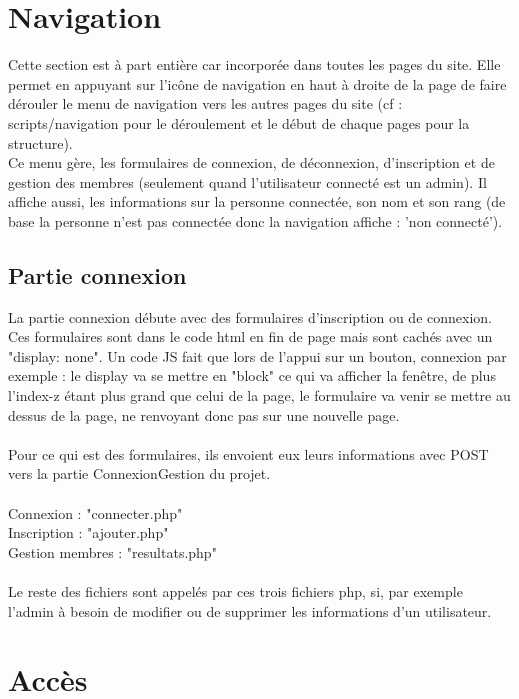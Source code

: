 \documentclass{article}
\begin{document}
\section{Navigation}

Cette section est à part entière car incorporée dans toutes les pages du site. Elle permet en appuyant sur l'icône de navigation en haut à droite de la page de faire dérouler le menu de navigation vers les autres pages du site (cf : scripts/navigation pour le déroulement et le début de chaque pages pour la structure).\\

Ce menu gère, les formulaires de connexion, de déconnexion, d'inscription et de gestion des membres (seulement quand l'utilisateur connecté est un admin). Il affiche aussi, les informations sur la personne connectée, son nom et son rang (de base la personne n'est pas connectée donc la navigation affiche : 'non connecté').

\subsection{Partie connexion}

La partie connexion débute avec des formulaires d'inscription ou de connexion. Ces formulaires sont dans le code html en fin de page mais sont cachés avec un "display: none". Un code JS fait que lors de l'appui sur un bouton, connexion par exemple : le display va se mettre en "block" ce qui va afficher la fenêtre, de plus l'index-z étant plus grand que celui de la page, le formulaire va venir se mettre au dessus de la page, ne renvoyant donc pas sur une nouvelle page.
\\
\\
Pour ce qui est des formulaires, ils envoient eux leurs informations avec POST vers la partie ConnexionGestion du projet. \\ \\
Connexion : "connecter.php" \\
Inscription : "ajouter.php" \\
Gestion membres : "resultats.php" \\ \\
Le reste des fichiers sont appelés par ces trois fichiers php, si, par exemple l'admin à besoin de modifier ou de supprimer les informations d'un utilisateur.

\section{Accès}
\end{document}
